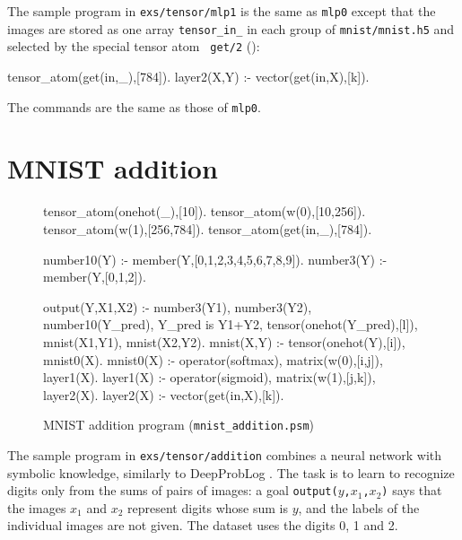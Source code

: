 \documentclass[a4paper]{report}
\begin{document}
The sample program in {\tt exs/tensor/mlp1} is the same as {\tt mlp0}
except that the images are stored as one array {\tt tensor\_in\_} in each
group of {\tt mnist/mnist.h5} and selected by the special tensor atom {\tt
	get/2} ():
\begin{prologcode}
tensor_atom(get(in,_),[784]).     %
layer2(X,Y) :- vector(get(in,X),[k]).
\end{prologcode}
The commands are the same as those of {\tt mlp0}.

\section{MNIST addition}
\label{sec:addition}

\begin{figure}[tb]
\begin{prologcode}[numbers=left]
tensor_atom(onehot(_),[10]).
tensor_atom(w(0),[10,256]).
tensor_atom(w(1),[256,784]).
tensor_atom(get(in,_),[784]).

number10(Y) :- member(Y,[0,1,2,3,4,5,6,7,8,9]).
number3(Y) :- member(Y,[0,1,2]).

output(Y,X1,X2) :- number3(Y1), number3(Y2), number10(Y_pred),
    Y_pred is Y1+Y2,
    tensor(onehot(Y_pred),[l]),
    mnist(X1,Y1), mnist(X2,Y2).
mnist(X,Y) :- tensor(onehot(Y),[i]), mnist0(X).
mnist0(X) :- operator(softmax), matrix(w(0),[i,j]), layer1(X).
layer1(X) :- operator(sigmoid), matrix(w(1),[j,k]), layer2(X).
layer2(X) :- vector(get(in,X),[k]).
\end{prologcode}
\caption{MNIST addition program ({\tt mnist\_addition.psm})}
\label{fig:addition}
\end{figure}

The sample program in {\tt exs/tensor/addition} combines a neural network
with symbolic knowledge, similarly to DeepProbLog \cite{manhaeve2018deepproblog}.
The task is to learn to recognize digits only from the sums of pairs of
images: a goal {\tt output($y$,$x_1$,$x_2$)} says that the images $x_1$
and $x_2$ represent digits whose sum is $y$, and the labels of the
individual images are not given.  The dataset uses the digits 0, 1 and 2.
\end{document}
